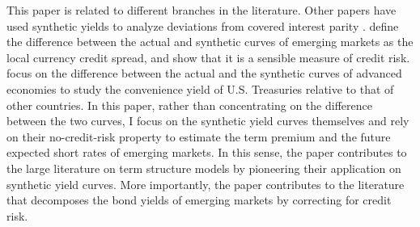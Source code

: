 {%

This paper is related to different branches in the literature. 
Other papers have used synthetic yields to analyze deviations from covered interest parity \citep*{DuTepperVerdelhan:2018}.
\cite{DuSchreger:2016JoF} define the difference between the actual and synthetic curves of emerging markets as the local currency credit spread, and show that it is a sensible measure of credit risk. 
\citet{DuImSchreger:2018JIE} focus on the difference between the actual and the synthetic curves of advanced economies to study the convenience yield of U.S. Treasuries relative to that of other countries.
In this paper, rather than concentrating on the difference between the two curves, I focus on the synthetic yield curves themselves and rely on their no-credit-risk property to estimate the term premium and the future expected short rates of emerging markets. 
In this sense, the paper contributes to the large literature on term structure models by pioneering their application on synthetic yield curves.
More importantly, the paper contributes to the literature that decomposes the bond yields of emerging markets \citep{BlakeRuleRummel:2015,ACDM:2019} by correcting for credit risk. 


}
